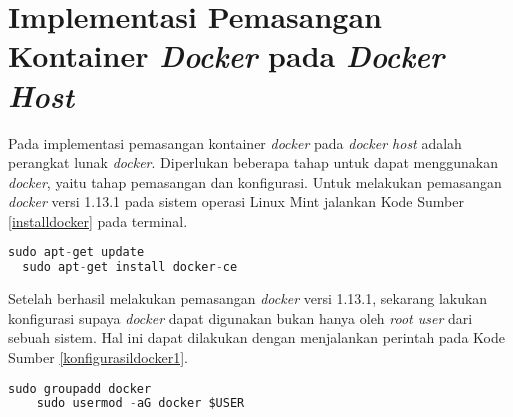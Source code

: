   \section{Implementasi Pemasangan Kontainer \textit{Docker} pada \textit{Docker Host}}
  Pada implementasi pemasangan kontainer \textit{docker} pada \textit{docker host} adalah perangkat lunak \textit{docker}. Diperlukan beberapa tahap untuk dapat menggunakan \textit{docker}, yaitu tahap pemasangan dan konfigurasi. Untuk melakukan pemasangan \textit{docker} versi 1.13.1 pada sistem operasi Linux Mint jalankan Kode Sumber \ref{installdocker} pada terminal.
  \newline
  \begin{minipage}{\linewidth}
  \begin{lstlisting}[caption=Perintah untuk installasi Docker,language=Python,label=installdocker]
  sudo apt-get update
  sudo apt-get install docker-ce
  \end{lstlisting}
  \end{minipage}
  
  Setelah berhasil melakukan pemasangan \textit{docker} versi 1.13.1, sekarang lakukan konfigurasi supaya \textit{docker} dapat digunakan bukan hanya oleh \textit{root user} dari sebuah sistem. Hal ini dapat dilakukan dengan menjalankan perintah pada Kode Sumber \ref{konfigurasildocker1}.
  \newline
    \begin{minipage}{\linewidth}
	\begin{lstlisting}[caption=Perintah untuk installasi Ansible,language=Python,label=konfigurasildocker1]
	sudo groupadd docker
	sudo usermod -aG docker $USER
	\end{lstlisting}
	\end{minipage}
	

